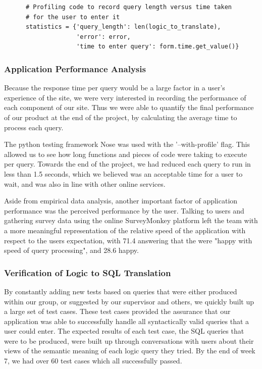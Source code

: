 \documentclass[a4paper, 11pt]{article}
\begin{document}
    \begin{verbatim}
      # Profiling code to record query length versus time taken
      # for the user to enter it
      statistics = {'query_length': len(logic_to_translate),
                    'error': error,
                    'time to enter query': form.time.get_value()}

    \end{verbatim}
    
    \subsubsection{Application Performance Analysis}
    Because the response time per query would be a large factor in a user's
    experience of the site, we were very interested in recording the performance
    of each component of our site. Thus we were able to quantify the final
    performance of our product at the end of the project, by calculating the
    average time to process each query.

    The python testing framework Nose was used with the '--with-profile' flag.
    This allowed us to see how long functions and pieces of code were taking to
    execute per query. Towards the end of the project, we had reduced each query
    to run in less than 1.5 seconds, which we believed was an acceptable time
    for a user to wait, and was also in line with other online services.

    Aside from empirical data analysis, another important factor of application
    performance was the perceived performance by the user. Talking to users and
    gathering survey data using the online SurveyMonkey platform left the team
    with a more meaningful representation of the relative speed of the
    application with respect to the users expectation, with 71.4%
    answering that the were "happy with speed of query processing", and 28.6%
    happy.

    \subsubsection{Verification of Logic to SQL Translation}
    By constantly adding new tests based on queries that were either produced
    within our group, or suggested by our supervisor and others, we quickly
    built up a large set of test cases. These test cases provided the assurance
    that our application was able to successfully handle all syntactically valid
    queries that a user could enter. The expected results of each test case,
    the SQL queries that were to be produced, were built up through conversations
    with users about their views of the semantic meaning of each logic query
    they tried. By the end of week 7, we had over  60 test cases which all
    successfully passed.
\end{document}
